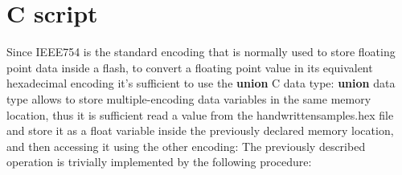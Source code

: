 \section{C script}
Since IEEE754 is the standard encoding that is normally used to store floating point data inside a flash, to convert a floating point value in its equivalent hexadecimal 
encoding it's sufficient to use the   \textbf{union}  C data type:
\textbf{union} data type allows to store multiple-encoding data variables in the same memory location, thus it is sufficient read a value from the handwrittensamples.hex file 
and store it as a float variable inside the previously declared memory location, and then accessing it using the other encoding:
The previously described operation is trivially implemented by the following procedure:

